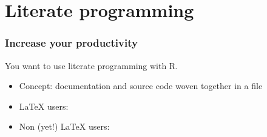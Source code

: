 \section{Literate programming}

\begin{frame}
  \frametitle{Increase your productivity}

  You want to use literate programming with R.
  \begin{itemize}
  \item Concept: documentation and source code woven together in a
    file
  \item {\LaTeX} users:
  \item Non (yet!) {\LaTeX} users:
  \end{itemize}
\end{frame}

